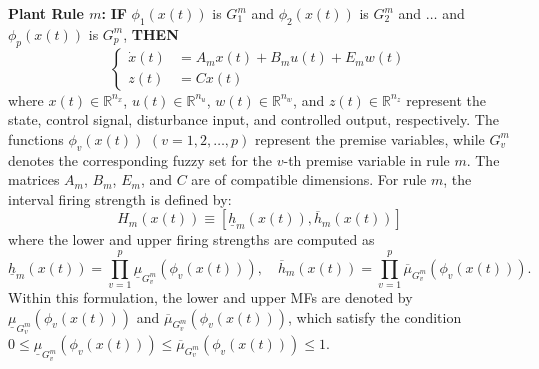 \documentclass[preprint,review,fleqn,sort&compress,3p]{elsarticle}
\theoremstyle{definition} %
\theoremstyle{definition}%
\begin{document}
\textbf{Plant Rule $m$:} 
\textbf{IF} $\phi_1(x(t))$ is $G^{m}_1$ and $\phi_2(x(t))$ is $G^{m}_2$ and $\ldots$ and $\phi_p(x(t))$ is $G^{m}_p$, \textbf{THEN}
\begin{equation}\label{eq:state_system}
	\left\{
	\begin{aligned}
		\dot{x}(t) &= A_{m} x(t) + B_{m} u(t) + E_{m} w(t) \\
		z(t) &= C x(t)
	\end{aligned}
	\right.
\end{equation}
where $x(t)\in\mathbb{R}^{n_x}$, $u(t)\in\mathbb{R}^{n_u}$,
$w(t)\in\mathbb{R}^{n_w}$, and $z(t)\in\mathbb{R}^{n_z}$
represent the state, control signal, disturbance input, and controlled output, respectively.
The functions $\phi_v(x(t))$ $(v=1,2,\ldots,p)$ represent the premise variables, while $G_v^m$ denotes the corresponding fuzzy set for the $v$-th premise variable in rule $m$.
The matrices $A_m$, $B_m$, $E_m$, and $C$ are of compatible dimensions.
For rule $m$, the interval firing strength is defined by:
\begin{equation}
	H_m(x(t)) \equiv \left[ \underline{h}_m(x(t)), \overline{h}_m(x(t)) \right]
\end{equation} 
where the lower and upper firing strengths are computed as
\begin{equation}
	\underline{h}_m(x(t)) = \prod_{v=1}^{p} \underline{\mu}_{G^m_{v}}(\phi_v(x(t))),
	\quad
	\overline{h}_m(x(t)) = \prod_{v=1}^{p} \overline{\mu}_{G^m_{v}}(\phi_v(x(t))).
\end{equation}
Within this formulation, the lower and upper MFs are denoted by $\underline{\mu}_{G^m_{v}}(\phi_v(x(t)))$ and $\overline{\mu}_{G^m_{v}}(\phi_v(x(t)))$, which satisfy the condition $0 \le \underline{\mu}_{G^m_{v}}(\phi_v(x(t))) \le \overline{\mu}_{G^m_{v}}(\phi_v(x(t))) \le 1$.
\end{document}
